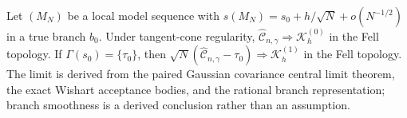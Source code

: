 Let \((M_N)\) be a local model sequence with \(s(M_N)=s_0+h/\sqrt N+o(N^{-1/2})\) in a true branch \(b_0\). Under tangent-cone regularity, \(\widehat{\mathcal C}_{n,\gamma}\Rightarrow\mathcal K_h^{(0)}\) in the Fell topology. If \(\Gamma(s_0)=\{\tau_0\}\), then \(\sqrt N(\widehat{\mathcal C}_{n,\gamma}-\tau_0)\Rightarrow\mathcal K_h^{(1)}\) in the Fell topology. The limit is derived from the paired Gaussian covariance central limit theorem, the exact Wishart acceptance bodies, and the rational branch representation; branch smoothness is a derived conclusion rather than an assumption.